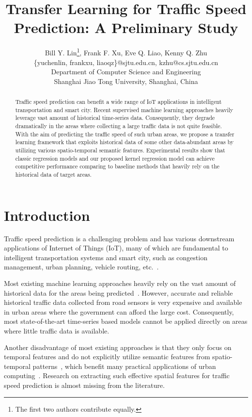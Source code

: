 \documentclass[letterpaper]{article} %
\title{Transfer Learning for Traffic Speed Prediction: A Preliminary Study}
\author{
	Bill Y. Lin\thanks{The first two authors contribute equally.}, 
	Frank F. Xu\footnotemark[1], Eve Q. Liao, 
	Kenny Q. Zhu
	\\[0.5ex]
	{\{yuchenlin, frankxu, liaoqz\}@sjtu.edu.cn, kzhu@cs.sjtu.edu.cn}\\[0.5ex]
	Department of Computer Science and Engineering\\[0.5ex]
	Shanghai Jiao Tong University, Shanghai, China
}
\begin{document}
\maketitle

\begin{abstract}
Traffic speed prediction can benefit a wide range of IoT applications in intelligent transportation and smart city. 
Recent supervised machine learning approaches heavily leverage vast amount of historical time-series data. 
Consequently, they degrade dramatically in the areas where collecting a large traffic data is not quite feasible.
With the aim of predicting the traffic speed of such urban areas, 
we propose a transfer learning framework that exploits historical data of some other data-abundant areas by utilizing various spatio-temporal semantic features. 
Experimental results show that classic regression models and our proposed kernel regression model can achieve competitive performance comparing to baseline methods that heavily rely on the historical data of target areas.
\end{abstract}
\section{Introduction}
Traffic speed prediction is a challenging problem and has various downstream applications of Internet of Things (IoT), many of which are fundamental to intelligent transportation systems and smart city, such as
congestion management, urban planning, vehicle routing, etc.~\cite{Pan2012,Xu2015,Mchugh2015}.

Most existing machine learning approaches heavily rely on the vast amount of historical data for the areas being predicted~\cite{Ren2014,Clark2003Traffic}.
However, accurate and reliable historical traffic data collected from road sensors is very expensive and available in urban areas where the government can afford the large cost.
Consequently, most state-of-the-art time-series based models cannot be applied directly on areas where little traffic data is available.

Another disadvantage of most existing approaches is that they only focus on temporal features and do not explicitly utilize semantic features from spatio-temporal patterns~\cite{yao2017short,lin2017road},
which benefit many practical applications of urban computing~\cite{zheng2014urban}.
Research on extracting such effective spatial features for traffic speed prediction is almost missing from the literature. 
\end{document}

